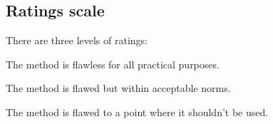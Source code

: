 \subsection{Ratings scale}
There are three levels of ratings:
\begin{description}
	\item[Excellent] The method is flawless for all practical purposes.
	\item[Good] The method is flawed but within acceptable norms.
	\item[Bad] The method is flawed to a point where it shouldn't be used.
\end{description}
